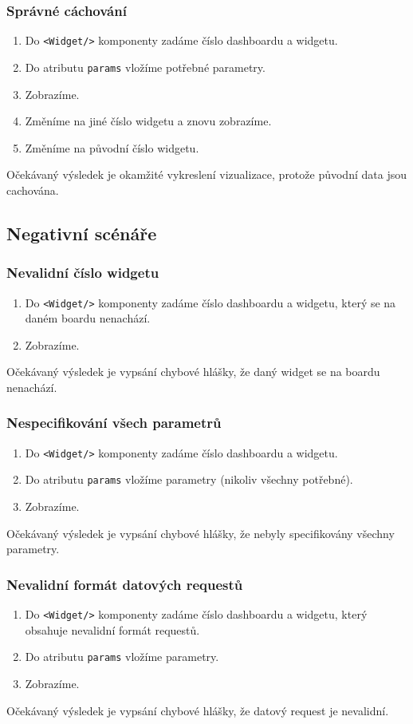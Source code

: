 \documentclass[czech, bc, kiv, he, iso690numb]{fasthesis}
\begin{document}
\subsubsection{Správné cáchování}
\begin{enumerate}
	\item Do \texttt{<Widget/>} komponenty zadáme číslo dashboardu a widgetu.
	\item Do atributu \texttt{params} vložíme potřebné parametry.
	\item Zobrazíme.
	\item Změníme na jiné číslo widgetu a znovu zobrazíme.
	\item Změníme na původní číslo widgetu.
\end{enumerate}
Očekávaný výsledek je okamžité vykreslení vizualizace, protože původní data jsou cachována.

\subsection{Negativní scénáře}
\subsubsection{Nevalidní číslo widgetu}
\begin{enumerate}
	\item Do \texttt{<Widget/>} komponenty zadáme číslo dashboardu a widgetu, který se na daném boardu nenachází.
	\item Zobrazíme.
\end{enumerate}
Očekávaný výsledek je vypsání chybové hlášky, že daný widget se na boardu nenachází.

\subsubsection{Nespecifikování všech parametrů}
\begin{enumerate}
	\item Do \texttt{<Widget/>} komponenty zadáme číslo dashboardu a widgetu.
	\item Do atributu \texttt{params} vložíme parametry (nikoliv všechny potřebné).
	\item Zobrazíme.
\end{enumerate}
Očekávaný výsledek je vypsání chybové hlášky, že nebyly specifikovány všechny parametry.

\subsubsection{Nevalidní formát datových requestů}
\begin{enumerate}
	\item Do \texttt{<Widget/>} komponenty zadáme číslo dashboardu a widgetu, který obsahuje nevalidní formát requestů.
	\item Do atributu \texttt{params} vložíme parametry.
	\item Zobrazíme.
\end{enumerate}
Očekávaný výsledek je vypsání chybové hlášky, že datový request je nevalidní.
\end{document}
